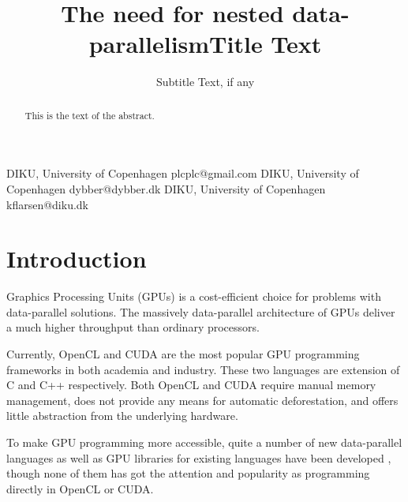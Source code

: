 \documentclass[preprint]{sigplanconf}
\title{The need for nested data-parallelism}
\begin{document}
\copyrightdata{[to be supplied]} 


\title{Title Text}
\subtitle{Subtitle Text, if any}

           {DIKU, University of Copenhagen}
           {plcplc@gmail.com}
           {DIKU, University of Copenhagen}
           {dybber@dybber.dk}
           {DIKU, University of Copenhagen}
           {kflarsen@diku.dk}

\maketitle

\begin{abstract}
This is the text of the abstract.
\end{abstract}




\section{Introduction}
Graphics Processing Units (GPUs) is a cost-efficient choice for
problems with data-parallel solutions. The massively data-parallel
architecture of GPUs deliver a much higher throughput than ordinary
processors.

Currently, OpenCL and CUDA are the most popular GPU programming
frameworks in both academia and industry. These two languages are
extension of C and C++ respectively. Both OpenCL and CUDA require manual
memory management, does not provide any means for automatic
deforestation, and offers little abstraction from the underlying
hardware.

To make GPU programming more accessible, quite a number of new
data-parallel languages as well as GPU libraries for existing
languages have been developed \cite{Catanzaro2011,
  chakravarty2011accelerating, mainland2010nikola,
  svensson2011obsidian, bergstra2010theano, homepage:rgpu,
  bergstrom2012nested}, though none of them has got the attention and
popularity as programming directly in OpenCL or CUDA.
\end{document}
